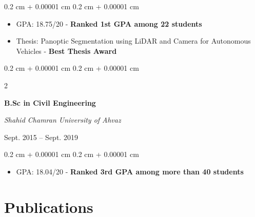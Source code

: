\documentclass[10pt, letterpaper]{article}
\newenvironment{highlights}{
    \begin{itemize}[
        topsep=0.10 cm,
        parsep=0.10 cm,
        partopsep=0pt,
        itemsep=0pt,
        leftmargin=0.4 cm + 10pt
    ]
}{
    \end{itemize}
} %
\newenvironment{onecolentry}{
    \begin{adjustwidth}{
        0.2 cm + 0.00001 cm
    }{
        0.2 cm + 0.00001 cm
    }
}{
    \end{adjustwidth}
} %
\newenvironment{twocolentry}[2][]{
    \onecolentry
    \def\secondColumn{#2}
    \setcolumnwidth{\fill, 4.5 cm}
    \begin{paracol}{2}
}{
    \switchcolumn \raggedleft \secondColumn
    \end{paracol}
    \endonecolentry
} %
\begin{document}
        \vspace{0.10 cm}
        \begin{onecolentry}
            \begin{highlights}
                \item GPA: 18.75/20 - \textbf{Ranked 1st GPA among 22 students}
                \item Thesis: Panoptic Segmentation using LiDAR and Camera for Autonomous Vehicles - \textbf{Best Thesis Award}
            \end{highlights}
        \end{onecolentry}
        \vspace{0.20 cm}
        \begin{twocolentry}{
            
            
        {Sept. 2015 – Sept. 2019}}
            \textbf{B.Sc in Civil Engineering}
            
            \textit{Shahid Chamran University of Ahvaz}

        \end{twocolentry}

        \vspace{0.10 cm}
        \begin{onecolentry}
            \begin{highlights}
                \item GPA: 18.04/20 - \textbf{Ranked 3rd GPA among more than 40 students}
            \end{highlights}
        \end{onecolentry}

        

    
    \section{\textcolor{primaryColor}{Publications}}
\end{document}
